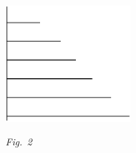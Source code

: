 \pend%
\count{}
\count{}
\count{}
%
%
  \vspace{2.5em}%
  \centerline{\includegraphics[width=0.36\textwidth]{gesamttex/edit_VIII,3/images/LH_35_09_14_001-002_d2.pdf}}%
  \vspace*{1.0em}
  \centerline{\lbrack\textit{Fig.~2}\rbrack}%
  \label{LH_35_09_14_002v_Fig.2}%
%
%
